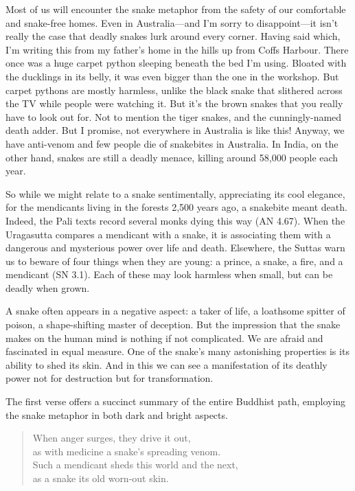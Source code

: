\documentclass[12pt,openany]{book}%
\begin{document}
Most of us will encounter the snake metaphor from the safety of our comfortable and snake-free homes. Even in Australia—and I’m sorry to disappoint—it isn’t really the case that deadly snakes lurk around every corner. Having said which, I’m writing this from my father’s home in the hills up from Coffs Harbour. There once was a huge carpet python sleeping beneath the bed I’m using. Bloated with the ducklings in its belly, it was even bigger than the one in the workshop. But carpet pythons are mostly harmless, unlike the black snake that slithered across the TV while people were watching it. But it’s the brown snakes that you really have to look out for. Not to mention the tiger snakes, and the cunningly-named death adder. But I promise, not everywhere in Australia is like this! Anyway, we have anti-venom and few people die of snakebites in Australia. In India, on the other hand, snakes are still a deadly menace, killing around 58,000 people each year.

So while we might relate to a snake sentimentally, appreciating its cool elegance, for the mendicants living in the forests 2,500 years ago, a snakebite meant death. Indeed, the Pali texts record several monks dying this way (AN 4.67). When the Uragasutta compares a mendicant with a snake, it is associating them with a dangerous and mysterious power over life and death. Elsewhere, the Suttas warn us to beware of four things when they are young: a prince, a snake, a fire, and a mendicant (SN 3.1). Each of these may look harmless when small, but can be deadly when grown.

A snake often appears in a negative aspect: a taker of life, a loathsome spitter of poison, a shape-shifting master of deception. But the impression that the snake makes on the human mind is nothing if not complicated. We are afraid and fascinated in equal measure. One of the snake’s many astonishing properties is its ability to shed its skin. And in this we can see a manifestation of its deathly power not for destruction but for transformation.

The first verse offers a succinct summary of the entire Buddhist path, employing the snake metaphor in both dark and bright aspects.

\begin{verse}%
When anger surges, they drive it out, \\
as with medicine a snake’s spreading venom. \\
Such a mendicant sheds this world and the next, \\
as a snake its old worn-out skin.

%
\end{verse}
\end{document}
